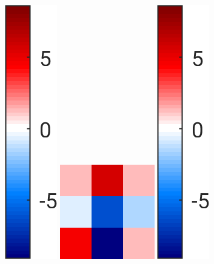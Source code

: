 \documentclass[10pt,twoside]{book}
\begin{document}
\begin{figure}
\begin{subfigure}{0.31\textwidth}
    \includegraphics[height=0.77\textwidth]{scenario4_training_filterWeights_colorbar}
    \includegraphics[height=0.77\textwidth]{scenario4_training_filterWeights_3}
    \includegraphics[height=0.77\textwidth]{scenario4_training_filterWeights_colorbar}

\end{subfigure}
\end{figure}
\end{document}
